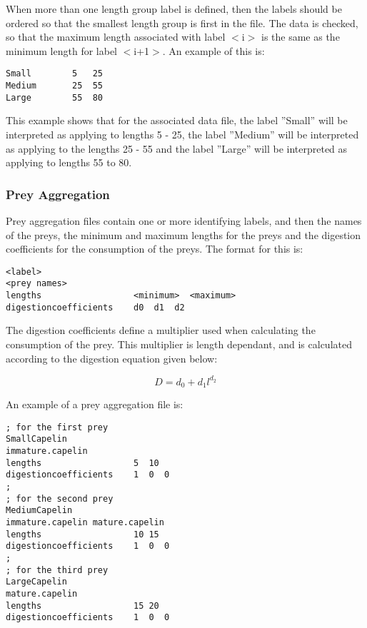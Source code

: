 \documentclass [a4paper, 10pt]{book}
\begin{document}
When more than one length group label is defined, then the labels should be ordered so that the smallest length group is first in the file.  The data is checked, so that the maximum length associated with label $<$i$>$ is the same as the minimum length for label $<$i+1$>$.  An example of this is:

{\small\begin{verbatim}
Small        5   25
Medium       25  55
Large        55  80
\end{verbatim}}

This example shows that for the associated data file, the label ''Small'' will be interpreted as applying to lengths 5 - 25, the label ''Medium'' will be interpreted as applying to the lengths 25 - 55 and the label ''Large'' will be interpreted as applying to lengths 55 to 80.

\subsubsection{Prey Aggregation}
Prey aggregation files contain one or more identifying labels, and then the names of the preys, the minimum and maximum lengths for the preys and the digestion coefficients for the consumption of the preys.  The format for this is:

{\small\begin{verbatim}
<label>
<prey names>
lengths                  <minimum>  <maximum>
digestioncoefficients    d0  d1  d2
\end{verbatim}}

The digestion coefficients define a multiplier used when calculating the consumption of the prey.  This multiplier is length dependant, and is calculated according to the digestion equation given below:

\begin{equation}\label{eq:digestion}
D = d_{0} + d_{1}l^{d_{2}}
\end{equation}

\bigskip
An example of a prey aggregation file is:

{\small\begin{verbatim}
; for the first prey
SmallCapelin
immature.capelin
lengths                  5  10
digestioncoefficients    1  0  0
;
; for the second prey
MediumCapelin
immature.capelin mature.capelin
lengths                  10 15
digestioncoefficients    1  0  0
;
; for the third prey
LargeCapelin
mature.capelin
lengths                  15 20
digestioncoefficients    1  0  0
\end{verbatim}}
\end{document}
